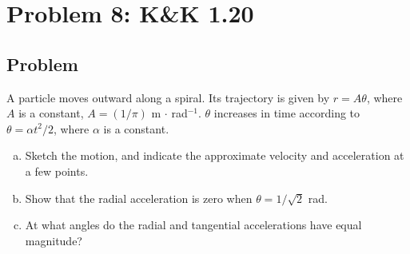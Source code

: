 \documentclass[solutions]{esg8012pset}
\begin{document}
\section*{Problem 8: K\&K 1.20}
\subsection*{Problem}
  A particle moves outward along a spiral. Its trajectory is given by
  $r = A\theta$, where $A$ is a constant, $A = (1/\pi )$ m $\cdot$ rad$^{-1}$.  $\theta$ increases in time according to $\theta =\alpha t^2 / 2$, where $\alpha$ is a constant.
  \begin{enumerate}[a.]
    \item Sketch the motion, and indicate the approximate velocity and acceleration at a few
  points.
    \item Show that the radial acceleration is zero when $\theta =1/\sqrt{2}$ rad.
    \item At what angles do the radial and tangential accelerations have equal magnitude?
  \end{enumerate}
\end{document}
